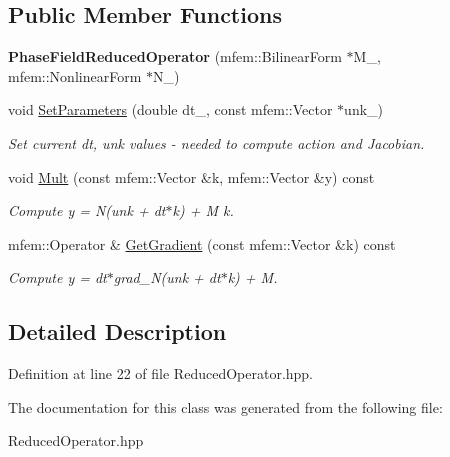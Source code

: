 \subsection*{Public Member Functions}
\begin{DoxyCompactItemize}
\item 
\mbox{\label{classPhaseFieldReducedOperator_a4e7966ec91d7c60a60933d9379bbc9bb}} 
{\bfseries Phase\+Field\+Reduced\+Operator} (mfem\+::\+Bilinear\+Form $\ast$M\+\_\+, mfem\+::\+Nonlinear\+Form $\ast$N\+\_\+)
\item 
\mbox{\label{classPhaseFieldReducedOperator_aaaa55d33260a9dc98051bd97f916bf46}} 
void \hyperlink{classPhaseFieldReducedOperator_aaaa55d33260a9dc98051bd97f916bf46}{Set\+Parameters} (double dt\+\_\+, const mfem\+::\+Vector $\ast$unk\+\_\+)
\begin{DoxyCompactList}\small\item\em Set current dt, unk values -\/ needed to compute action and Jacobian. \end{DoxyCompactList}\item 
\mbox{\label{classPhaseFieldReducedOperator_a3ca66ba9df28451a8648e00db03222e1}} 
void \hyperlink{classPhaseFieldReducedOperator_a3ca66ba9df28451a8648e00db03222e1}{Mult} (const mfem\+::\+Vector \&k, mfem\+::\+Vector \&y) const
\begin{DoxyCompactList}\small\item\em Compute y = N(unk + dt$\ast$k) + M k. \end{DoxyCompactList}\item 
\mbox{\label{classPhaseFieldReducedOperator_aa52eaf1e61d9713732e23eb891ad9b05}} 
mfem\+::\+Operator \& \hyperlink{classPhaseFieldReducedOperator_aa52eaf1e61d9713732e23eb891ad9b05}{Get\+Gradient} (const mfem\+::\+Vector \&k) const
\begin{DoxyCompactList}\small\item\em Compute y = dt$\ast$grad\+\_\+N(unk + dt$\ast$k) + M. \end{DoxyCompactList}\end{DoxyCompactItemize}


\subsection{Detailed Description}


Definition at line 22 of file Reduced\+Operator.\+hpp.



The documentation for this class was generated from the following file\+:\begin{DoxyCompactItemize}
\item 
Reduced\+Operator.\+hpp\end{DoxyCompactItemize}
